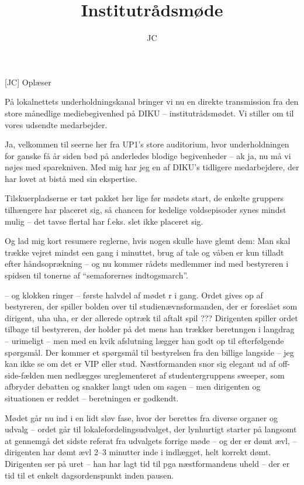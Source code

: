 \documentclass[a4paper,11pt]{article}
\title{Institutrådsmøde}
\author{JC}
\begin{document}
\maketitle

\begin{roles}
[JC] Oplæser

\end{roles}


\begin{sketch}

 På lokalnettets underholdningskanal bringer vi nu en direkte
transmission fra den store månedlige mediebegivenhed på DIKU --
institutrådsmødet. Vi stiller om til vores udsendte medarbejder.

 Ja, velkommen til seerne her fra UP1's store auditorium, hvor
underholdningen for ganske få år siden bød på anderledes blodige begivenheder --
ak ja, nu må vi nøjes med sparekniven. Med mig har jeg en af DIKU's tidligere
medarbejdere, der har lovet at bistå med sin ekspertise.

Tilskuerpladserne er tæt pakket her lige før mødets start, de enkelte gruppers
tilhængere har placeret sig, så chancen for kedelige voldsepisoder synes mindst
mulig -- det tavse flertal har f.eks. slet ikke placeret sig.

Og lad mig kort resumere reglerne, hvis nogen skulle have glemt dem: Man skal
trække vejret mindst een gang i minuttet, brug af tale og våben er kun tilladt
efter håndsoprækning -- og nu kommer rådets medlemmer ind med bestyreren i
spidsen til tonerne af ``semaforernes indtogsmarch''.

-- og klokken ringer -- første halvdel af mødet r i gang. Ordet gives op af
bestyreren, der spiller bolden over til studienævnsformanden, der er foreslået
som dirigent, uha uha, er der allerede optræk til aftalt spil ??? Dirigenten
spiller ordet tilbage til bestyreren, der holder på det mens han trækker
beretnngen i langdrag -- urimeligt -- men med en kvik afslutning lægger han godt
op til efterfølgende spørgsmål. Der kommer et spørgsmål til bestyrelsen fra den
billige langside -- jeg kan ikke se om det er VIP eller stud.  Næstformanden
snor sig elegant ud af off-side-fælden men nedlægges ureglementeret af
studentergruppens sweeper, som afbryder debatten og snakker langt uden om sagen
-- men dirigenten og situationen er reddet -- beretningen er godkendt.

Mødet går nu ind i en lidt sløv fase, hvor der berettes fra diverse organer og
udvalg -- ordet går til lokalefordelingsudvalget, der lynhurtigt starter på
langsomt at gennemgå det sidste referat fra udvalgets forrige møde -- og der er
dømt ævl, -- dirigenten har dømt ævl 2--3 minutter inde i indlægget, helt
korrekt dømt. Dirigenten ser på uret -- han har lagt tid til pga næstformandens
uheld -- der er tid til et enkelt dagsordenspunkt inden pausen.


\end{sketch}
\end{document}
